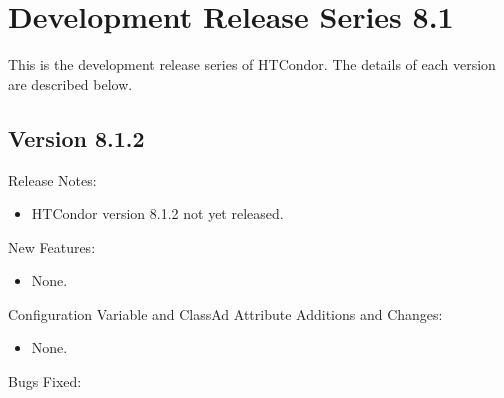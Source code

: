
\section{\label{sec:History-8-1}Development Release Series 8.1}

This is the development release series of HTCondor.
The details of each version are described below.

\subsection*{\label{sec:New-8-1-2}Version 8.1.2}

\noindent Release Notes:

\begin{itemize}

\item HTCondor version 8.1.2 not yet released.

\end{itemize}


\noindent New Features:

\begin{itemize}

\item None.

\end{itemize}

\noindent Configuration Variable and ClassAd Attribute Additions and Changes:

\begin{itemize}

\item None.

\end{itemize}

\noindent Bugs Fixed:


